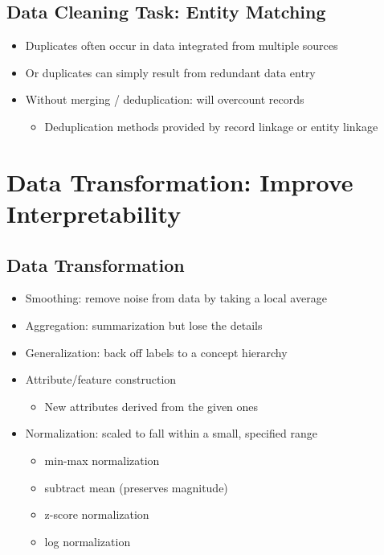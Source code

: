 \documentclass[11pt]{article}
\theoremstyle{definition}
\begin{document}
\subsection{Data Cleaning Task: Entity Matching}
\begin{itemize}
    \item Duplicates often occur in data integrated from multiple sources
    \item Or duplicates can simply result from redundant data entry
    \item Without merging / deduplication: will overcount records
    \begin{itemize}
        \item Deduplication methods provided by record linkage or entity linkage
    \end{itemize}
\end{itemize}
\section{Data Transformation:
Improve Interpretability}
\subsection{Data Transformation}
\begin{itemize}
    \item Smoothing: remove noise from data by taking a local average
    \item Aggregation: summarization but lose the details
    \item Generalization: back off labels to a concept hierarchy
    \item Attribute/feature construction
    \begin{itemize}
        \item New attributes derived from the given ones
    \end{itemize}
    \item Normalization: scaled to fall within a small, specified range
    \begin{itemize}
        \item min-max normalization
        \item subtract mean (preserves magnitude)
        \item z-score normalization
        \item log normalization
    \end{itemize}
\end{itemize}
\end{document}
